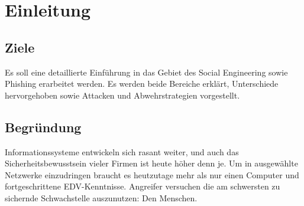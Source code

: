 \chapter{Einleitung}

\section{Ziele}
Es soll eine detaillierte Einführung in das Gebiet des Social Engineering sowie Phishing erarbeitet werden.
Es werden beide Bereiche erklärt, Unterschiede hervorgehoben sowie Attacken und Abwehrstrategien vorgestellt.

\section{Begründung}
Informationssysteme entwickeln sich rasant weiter, und auch das Sicherheitsbewusstsein vieler Firmen ist heute höher denn je. Um in ausgewählte Netzwerke einzudringen braucht es heutzutage mehr als nur einen Computer und fortgeschrittene EDV-Kenntnisse. Angreifer versuchen die am schwersten zu sichernde Schwachstelle auszunutzen: Den Menschen.
